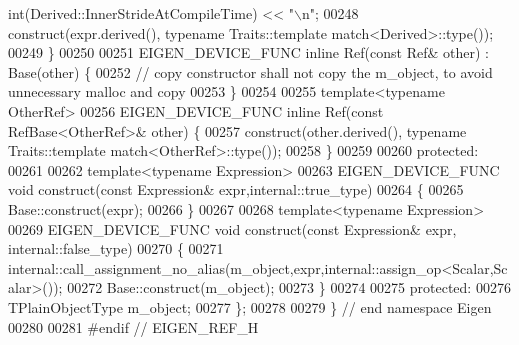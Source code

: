 \begin{DoxyCode}
{       int(Derived::InnerStrideAtCompileTime) << "\(\backslash\)n";}
00248       construct(expr.derived(), \textcolor{keyword}{typename} Traits::template match<Derived>::type());
00249     \}
00250 
00251     EIGEN\_DEVICE\_FUNC \textcolor{keyword}{inline} Ref(\textcolor{keyword}{const} Ref& other) : Base(other) \{
00252       \textcolor{comment}{// copy constructor shall not copy the m\_object, to avoid unnecessary malloc and copy}
00253     \}
00254 
00255     \textcolor{keyword}{template}<\textcolor{keyword}{typename} OtherRef>
00256     EIGEN\_DEVICE\_FUNC \textcolor{keyword}{inline} Ref(\textcolor{keyword}{const} RefBase<OtherRef>& other) \{
00257       construct(other.derived(), \textcolor{keyword}{typename} Traits::template match<OtherRef>::type());
00258     \}
00259 
00260   \textcolor{keyword}{protected}:
00261 
00262     \textcolor{keyword}{template}<\textcolor{keyword}{typename} Expression>
00263     EIGEN\_DEVICE\_FUNC \textcolor{keywordtype}{void} construct(\textcolor{keyword}{const} Expression& expr,internal::true\_type)
00264     \{
00265       Base::construct(expr);
00266     \}
00267 
00268     \textcolor{keyword}{template}<\textcolor{keyword}{typename} Expression>
00269     EIGEN\_DEVICE\_FUNC \textcolor{keywordtype}{void} construct(\textcolor{keyword}{const} Expression& expr, internal::false\_type)
00270     \{
00271       internal::call\_assignment\_no\_alias(m\_object,expr,internal::assign\_op<Scalar,Scalar>());
00272       Base::construct(m\_object);
00273     \}
00274 
00275   \textcolor{keyword}{protected}:
00276     TPlainObjectType m\_object;
00277 \};
00278 
00279 \} \textcolor{comment}{// end namespace Eigen}
00280 
00281 \textcolor{preprocessor}{#endif // EIGEN\_REF\_H}
\end{DoxyCode}
